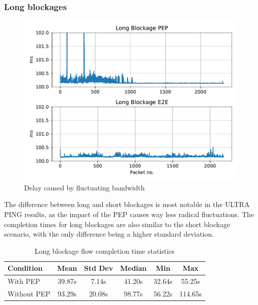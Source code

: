 \documentclass[a4paper,english, 11pt]{report}
\begin{document}
\subsubsection{Long blockages}

\begin{figure}[h!] %
	\centering
	\includegraphics[scale=0.50]{../diagrams/witestlab/longblockage.pdf}
  	\caption{Delay caused by fluctuating bandwidth}
  	\label{fig:witestlab_graph_delay}
\end{figure}

The difference between long and short blockages is most notable in the ULTRA PING results, as the impact of the PEP causes way less radical fluctuations. The completion times for long blockages are also similar to the short blockage scenario, with the only difference being a higher standard deviation.\\

\begin{table}[h!]
\centering
\begin{tabularx}{\linewidth}{lCCCCC}
\toprule
Condition & Mean & Std Dev & Median & Min & Max \\
\midrule
With PEP & 39.87s & 7.14s & 41.20s & 32.64s & 55.25s\\
Without PEP & 93.29s & 20.08s & 98.77s & 56.22s & 114.65s\\
\bottomrule
\end{tabularx}
\caption{Long blockage flow completion time statistics}
\label{tab:lb_fct_statistics}
\end{table}
\end{document}
